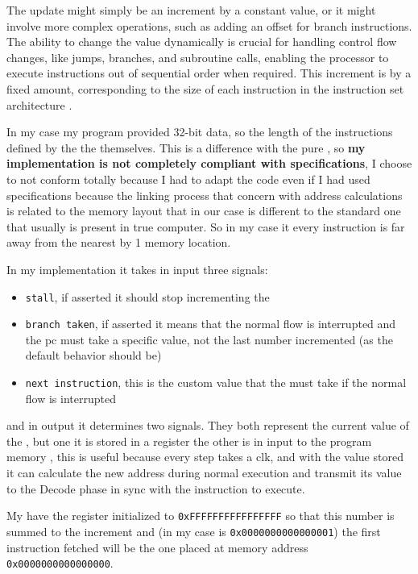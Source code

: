 \documentclass{article}
\begin{document}
    The update might simply be an increment by a constant value, or it might involve more complex operations, 
    such as adding an offset for branch instructions. The ability to change the \PC value dynamically is crucial for 
    handling control flow changes, like jumps, branches, and subroutine calls, enabling the processor to execute instructions 
    out of sequential order when required.
    This increment is by a fixed amount, corresponding to the size of each instruction in the instruction set architecture \cite{chatgpt}.
    
    In my case my program \RAM provided 32-bit data, so the length of the instructions defined by the the \ISA themselves. 
    This is a difference with the pure \RISCV \ISA, so \textbf{my implementation is not completely compliant with \RISCV specifications}, 
    I choose to not conform totally because I had to adapt the code even if 
    I had used \RISCV specifications because the \gls{linking} process that concern with address calculations 
    is related to the memory layout that in our case is different to the standard one that usually is present in true computer.
    So in my case it every instruction is far away from the nearest by 1 memory location. 

    In my implementation it takes in input three signals:
    \begin{itemize}
        \item \texttt{stall},
            if asserted it should stop incrementing the \PC
        \item \texttt{branch taken},
            if asserted it means that the normal flow is interrupted and the \acrlong{pc} must take a specific value, 
            not the last number incremented (as the default behavior should be)
        \item \texttt{next instruction},
            this is the custom value that the \PC must take if the normal flow is interrupted
    \end{itemize}
    and in output it determines two signals. They both represent the current value of the \PC, but one it is stored in a register 
    the other is in input to the program memory , this is useful because every step takes a \gls{clk}, 
    and with the value stored it can calculate the new address during normal execution and 
    transmit its value to the Decode phase  in sync with the instruction to execute.

    My \PC have the register initialized to \texttt{0xFFFFFFFFFFFFFFFF} so that this number is summed 
    to the increment and (in my case is \texttt{0x0000000000000001}) the first instruction fetched 
    will be the one placed at memory address \texttt{0x0000000000000000}.
\end{document}
